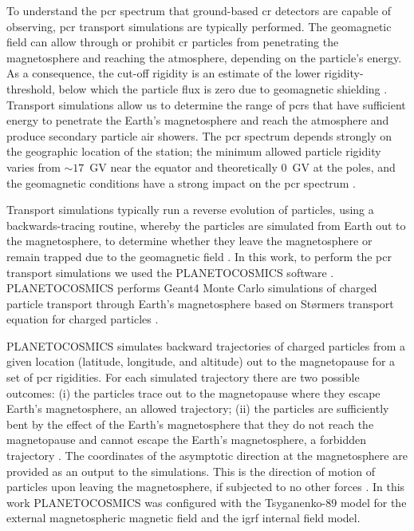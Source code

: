 To understand the \gls{pcr} spectrum that ground-based \gls{cr} detectors are capable of observing, \gls{pcr} transport simulations are typically performed. The geomagnetic field can allow through or prohibit \gls{cr} particles from penetrating the magnetosphere and reaching the atmosphere, depending on the particle's energy. As a consequence, the cut-off rigidity is an estimate of the lower rigidity-threshold, below which the particle flux is zero due to geomagnetic shielding \citep{shea_study_1965, danilova_mapping_2019}. Transport simulations allow us to determine the range of \glspl{pcr} that have sufficient energy to penetrate the Earth's magnetosphere and reach the atmosphere and produce secondary particle air showers. The \gls{pcr} spectrum depends strongly on the geographic location of the station; the minimum allowed particle rigidity varies from $\sim 17$~GV near the equator and theoretically 0~GV at the poles, and the geomagnetic conditions have a strong impact on the \gls{pcr} spectrum \citep{shea_study_1965, cramp_modelling_1996, desorgher_planetocosmics_2006, danilova_mapping_2019}. 

Transport simulations typically run a reverse evolution of particles, using a backwards-tracing routine, whereby the particles are simulated from Earth out to the magnetosphere, to determine whether they leave the magnetosphere or remain trapped due to the geomagnetic field \citep{shea_study_1965}. In this work, to perform the \gls{pcr} transport simulations we used the PLANETOCOSMICS software \citep{desorgher_planetocosmics_2005}. PLANETOCOSMICS performs Geant4 Monte Carlo simulations of charged particle transport through Earth's magnetosphere based on St\o rmers transport equation for charged particles \citep{desorgher_planetocosmics_2005, desorgher_planetocosmics_2006}. 

PLANETOCOSMICS simulates backward trajectories of charged particles from a given location (latitude, longitude, and altitude) out to the magnetopause for a set of \gls{pcr} rigidities. For each simulated trajectory there are two possible outcomes: (i) the particles trace out to the magnetopause where they escape Earth's magnetosphere, an allowed trajectory; (ii) the particles are sufficiently bent by the effect of the Earth's magnetosphere that they do not reach the magnetopause and cannot escape the Earth's magnetosphere, a forbidden trajectory \citep{shea_study_1965, desorgher_planetocosmics_2005, desorgher_planetocosmics_2006}. The coordinates of the asymptotic direction at the magnetosphere are provided as an output to the simulations. This is the direction of motion of particles upon leaving the magnetosphere, if subjected to no other forces \citep{shea_study_1965, desorgher_planetocosmics_2006, danilova_mapping_2019}. In this work PLANETOCOSMICS was configured with the Tsyganenko-89 model for the external magnetospheric magnetic field and the \gls{igrf} internal field model.

